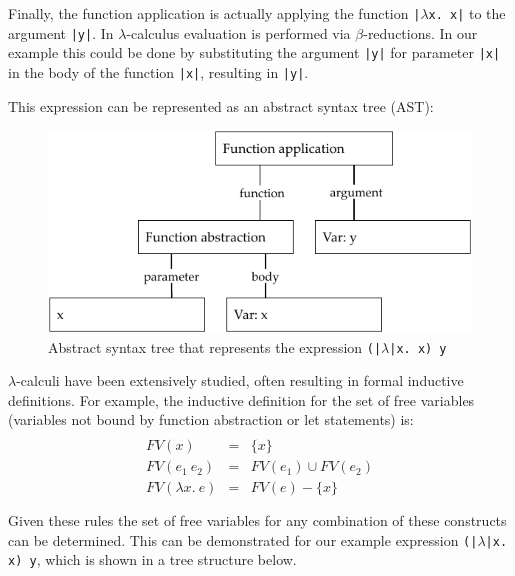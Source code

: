 \documentclass[a4paper,fleqn,oneside,12pt]{report}
\begin{document}
Finally, the function application is actually applying the function \texttt{|$\lambda$x. x|} to the argument \texttt{|y|}. In $\lambda$-calculus evaluation is performed via $\beta$-reductions. In our example this could be done by substituting the argument \texttt{|y|} for parameter \texttt{|x|} in the body of the function \texttt{|x|}, resulting in \texttt{|y|}.

This expression can be represented as an abstract syntax tree (AST):

{\centering \begin{figure}[h!]
  \centering
  \includegraphics[width=0.8\linewidth]{images/ast_abs_id_y.pdf}
  \caption{Abstract syntax tree that represents the expression \texttt{(|$\lambda$|x. x) y}}
\end{figure} \par}

$\lambda$-calculi have been extensively studied, often resulting in formal inductive definitions. For example, the inductive definition for the set of free variables (variables not bound by function abstraction or let statements) is:
$$\begin{array}{lcl}
  \\
    FV(x)               & = & \{ x \}\\
    FV(e_1\ e_2)        & = & FV(e_1) \cup FV(e_2)\\
    FV(\lambda x.\ e  ) & = & FV(e) - \{ x \}\\
  \\
\end{array}$$
Given these rules the set of free variables for any combination of these constructs can be determined. This can be demonstrated for our example expression \texttt{(|$\lambda$|x. x) y}, which is shown in a tree structure below.
\end{document}
